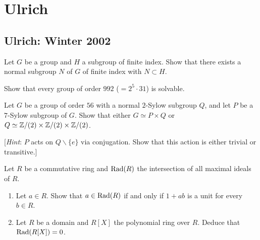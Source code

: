 \section{Ulrich}
\subsection{Ulrich: Winter 2002}
\setcounter{exercise}{0}
\setcounter{equation}{0}

\begin{problem}
  Let $G$ be a group and $H$ a subgroup of finite index. Show that there
  exists a normal subgroup $N$ of $G$ of finite index with $N\subset H$.
\end{problem}
\begin{solution}
\end{solution}

\begin{problem}
  Show that every group of order $992$ ($=2^5\cdot 31$) is solvable.
\end{problem}
\begin{solution}
\end{solution}

\begin{problem}
  Let $G$ be a group of order $56$ with a normal $2$-Sylow subgroup $Q$,
  and let $P$ be a $7$-Sylow subgroup of $G$. Show that either $G\simeq
  P\times Q$ or $Q\simeq\mathbb{Z}/(2)\times\mathbb{Z}/(2)\times\mathbb{Z}/(2)$.

  [\emph{Hint}: $P$ acts on $Q\smallsetminus\{e\}$ via conjugation. Show
  that this action is either trivial or transitive.]
\end{problem}
\begin{solution}
\end{solution}

\begin{problem}
  Let $R$ be a commutative ring and $\operatorname{Rad}(R)$ the intersection of all
  maximal ideals of $R$.
  \begin{enumerate}[label=(\alph*),noitemsep]
  \item Let $a\in R$. Show that $a\in\operatorname{Rad}(R)$ if and only if $1+ab$ is a
    unit for every $b\in R$.
  \item Let $R$ be a domain and $R[X]$ the polynomial ring over
    $R$. Deduce that $\operatorname{Rad}(R[X])=0$.
  \end{enumerate}
\end{problem}
\begin{solution}
\end{solution}

